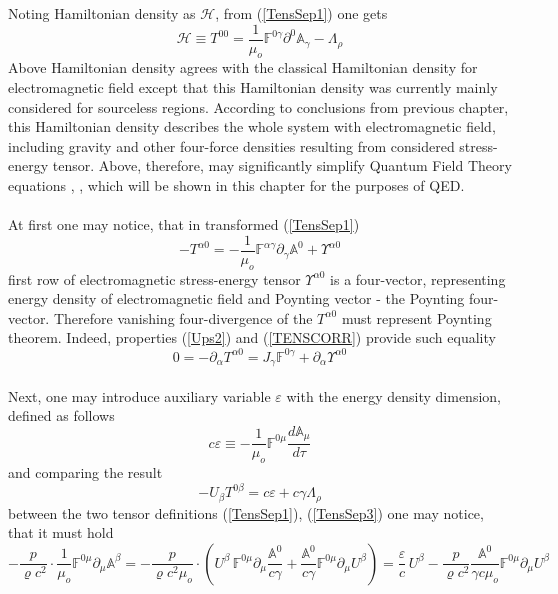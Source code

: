\documentclass[aps,prx,preprint,groupedaddress,showkeys]{revtex4-2}
\newcommand{\mds}[1] {\frac{d {#1}}{d\tau}}
\begin{document}
Noting Hamiltonian density as $\mathcal{H}$, from (\ref{TensSep1}) one gets
\begin{equation} \label{HQ2}
\mathcal{H} \equiv  T^{0 0} = \frac{1}{\mu_o}\mathbb{F}^{0 \gamma} \partial^{0} \mathbb{A}_{\gamma} - \Lambda_{\rho}
\end{equation}
Above Hamiltonian density agrees with the classical Hamiltonian density for electromagnetic field \cite{LDEM} except that this Hamiltonian density was currently mainly considered for sourceless regions. According to conclusions from previous chapter, this Hamiltonian density describes the whole system with electromagnetic field, including gravity and other four-force densities resulting from considered stress-energy tensor. Above, therefore, may significantly simplify Quantum Field Theory equations  \cite{QFT1}, \cite{QFT2}, \cite{QFT3} which will be shown in this chapter for the purposes of QED.\\
~\\
At first one may notice, that in transformed (\ref{TensSep1})
\begin{equation} \label{HQ4}
- T^{\alpha 0} =  - \frac{1}{\mu_o} \mathbb{F}^{\alpha \gamma} \partial_{\gamma} \mathbb{A}^{0} + \Upsilon^{\alpha 0}
\end{equation}
first row of electromagnetic stress-energy tensor $\Upsilon^{\alpha 0}$ is a four-vector, representing energy density of electromagnetic field and Poynting vector \cite{PoV} - the Poynting four-vector. Therefore vanishing four-divergence of the $T^{\alpha 0}$ must represent Poynting theorem. Indeed, properties (\ref{Ups2}) and (\ref{TENSCORR}) provide such equality
\begin{equation} \label{HQ5}
0 = - \partial_{\alpha} T^{\alpha 0} = J_{\gamma} \mathbb{F}^{0 \gamma} + \partial_{\alpha} \Upsilon^{\alpha 0} 
\end{equation}
~\\
Next, one may introduce auxiliary variable $\varepsilon$ with the energy density dimension, defined as follows
\begin{equation} \label{EpsDef}
c\varepsilon \equiv - \frac{1}{\mu_o} \mathbb{F}^{0 \mu} \mds {\mathbb{A}_{\mu}}
\end{equation}
and comparing the result
\begin{equation} \label{Lagr}
- U_{\beta}T^{0 \beta} = c\varepsilon + c\gamma \Lambda_{\rho}
\end{equation}
between the two tensor definitions (\ref{TensSep1}), (\ref{TensSep3}) one may notice, that it must hold
\begin{equation} \label{EpsProp}
- \frac{p}{\varrho c^2} \cdot \frac{1}{\mu_o} \mathbb{F}^{0 \mu} \partial_{\mu} \mathbb{A}^{\beta} = - \frac{p}{\varrho c^2 \mu_o} \cdot \left ( U^{\beta} \, \mathbb{F}^{0 \mu} \partial_{\mu} \frac{\mathbb{A}^0}{c\gamma} + \frac{\mathbb{A}^0}{c\gamma} \mathbb{F}^{0 \mu} \partial_{\mu} U^{\beta} \right )  = \frac{\varepsilon}{c} \, U^{\beta} - \frac{p}{\varrho c^2} \frac{\mathbb{A}^0}{\gamma c\mu_o} \mathbb{F}^{0 \mu} \partial_{\mu} U^{\beta}
\end{equation}
\end{document}
